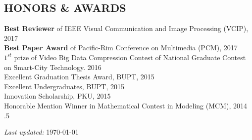 \documentclass[margin, 10pt]{res} %
\begin{document}
\begin{resume}
%



\section{HONORS \& AWARDS}

{\bf Best Reviewer} of IEEE Visual Communication and Image Processing (VCIP), \hfill 2017 \\
{\bf Best Paper Award} of Pacific-Rim Conference on Multimedia (PCM), \hfill 2017 \\
{\bf ${1}^{st}$} prize of Video Big Data Compression Contest of National Graduate Contest on Smart-City Technology. \hfill 2016 \\
Excellent Graduation Thesis Award, BUPT, \hfill 2015 \\
Excellent Undergraduates, BUPT, \hfill 2015 \\
Innovation Scholarship, PKU, \hfill 2015 \\
Honorable Mention Winner in Mathematical Contest in Modeling (MCM), \hfill 2014 \\


\moveleft.5\hoffset\centerline{
\textit{Last updated:}
\today
}

\end{resume}
\end{document}
